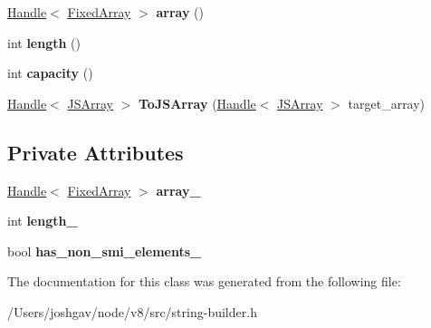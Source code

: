 \begin{DoxyCompactItemize}
\item 
\hyperlink{classv8_1_1internal_1_1_handle}{Handle}$<$ \hyperlink{classv8_1_1internal_1_1_fixed_array}{Fixed\+Array} $>$ {\bfseries array} ()\hypertarget{classv8_1_1internal_1_1_fixed_array_builder_aeb2d267be0c5e6e2e0255d33066729b5}{}\label{classv8_1_1internal_1_1_fixed_array_builder_aeb2d267be0c5e6e2e0255d33066729b5}

\item 
int {\bfseries length} ()\hypertarget{classv8_1_1internal_1_1_fixed_array_builder_a329de6f0aa5c2c1d7fc52f4e1598401f}{}\label{classv8_1_1internal_1_1_fixed_array_builder_a329de6f0aa5c2c1d7fc52f4e1598401f}

\item 
int {\bfseries capacity} ()\hypertarget{classv8_1_1internal_1_1_fixed_array_builder_a624838799277a1948401049e00084525}{}\label{classv8_1_1internal_1_1_fixed_array_builder_a624838799277a1948401049e00084525}

\item 
\hyperlink{classv8_1_1internal_1_1_handle}{Handle}$<$ \hyperlink{classv8_1_1internal_1_1_j_s_array}{J\+S\+Array} $>$ {\bfseries To\+J\+S\+Array} (\hyperlink{classv8_1_1internal_1_1_handle}{Handle}$<$ \hyperlink{classv8_1_1internal_1_1_j_s_array}{J\+S\+Array} $>$ target\+\_\+array)\hypertarget{classv8_1_1internal_1_1_fixed_array_builder_a3b89ea4964b24b673fe02c05c7274b23}{}\label{classv8_1_1internal_1_1_fixed_array_builder_a3b89ea4964b24b673fe02c05c7274b23}

\end{DoxyCompactItemize}
\subsection*{Private Attributes}
\begin{DoxyCompactItemize}
\item 
\hyperlink{classv8_1_1internal_1_1_handle}{Handle}$<$ \hyperlink{classv8_1_1internal_1_1_fixed_array}{Fixed\+Array} $>$ {\bfseries array\+\_\+}\hypertarget{classv8_1_1internal_1_1_fixed_array_builder_a115f9164b01b60afcfc824149248ab08}{}\label{classv8_1_1internal_1_1_fixed_array_builder_a115f9164b01b60afcfc824149248ab08}

\item 
int {\bfseries length\+\_\+}\hypertarget{classv8_1_1internal_1_1_fixed_array_builder_a91295e0817938a8fc5b3461125b95ec8}{}\label{classv8_1_1internal_1_1_fixed_array_builder_a91295e0817938a8fc5b3461125b95ec8}

\item 
bool {\bfseries has\+\_\+non\+\_\+smi\+\_\+elements\+\_\+}\hypertarget{classv8_1_1internal_1_1_fixed_array_builder_afbffdb181ec11dbb13d748f6417df221}{}\label{classv8_1_1internal_1_1_fixed_array_builder_afbffdb181ec11dbb13d748f6417df221}

\end{DoxyCompactItemize}


The documentation for this class was generated from the following file\+:\begin{DoxyCompactItemize}
\item 
/\+Users/joshgav/node/v8/src/string-\/builder.\+h\end{DoxyCompactItemize}
